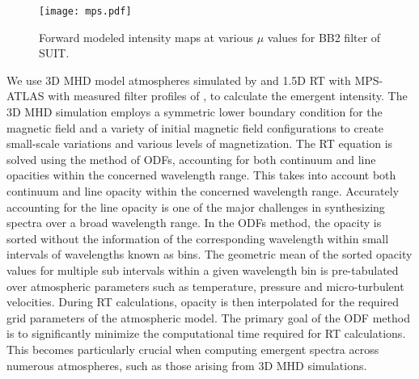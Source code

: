 \begin{figure}
    \centering
    \texttt{[image: mps.pdf]}
        \caption{Forward modeled intensity maps at various $\mu$ values for BB2 filter of SUIT.}
    \label{fig:flux_maps}
\end{figure}

We use 3D MHD model atmospheres simulated by \cite{rempel20} and 1.5D RT with MPS-ATLAS \citep[see e.g.,][for details]{anusha21} with measured filter profiles of {\suit}, to calculate the emergent intensity. The 3D MHD simulation employs a symmetric lower boundary condition for the magnetic field and a variety of initial magnetic field configurations to create small-scale variations and various levels of magnetization. The RT equation is solved using the method of ODFs, accounting for both continuum and line opacities within the concerned wavelength range. This takes into account both continuum and line opacity within the concerned wavelength range. Accurately accounting for the line opacity is one of the major challenges in synthesizing spectra over a broad wavelength range. In the ODFs method, the opacity is sorted without the information of the corresponding wavelength within small intervals of wavelengths known as bins. The geometric mean of the sorted opacity values for multiple sub intervals within a given wavelength bin is pre-tabulated over atmospheric parameters such as temperature, pressure and micro-turbulent velocities. During RT calculations, opacity is then interpolated for the required grid parameters of the atmospheric model. The primary goal of the ODF method is to significantly minimize the computational time required for RT calculations. This becomes particularly crucial when computing emergent spectra across numerous atmospheres, such as those arising from 3D MHD simulations. 